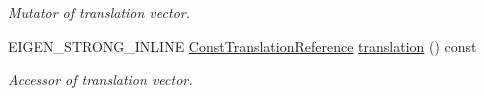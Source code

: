 \begin{DoxyCompactItemize}
\begin{DoxyCompactList}\small\item\em Mutator of translation vector. \end{DoxyCompactList}\item 
E\+I\+G\+E\+N\+\_\+\+S\+T\+R\+O\+N\+G\+\_\+\+I\+N\+L\+I\+NE \hyperlink{class_sophus_1_1_sim3_group_base_aee08d851899efe59011fb1b58dbf1139}{Const\+Translation\+Reference} \hyperlink{class_sophus_1_1_sim3_group_base_a5a6f1907abc5a581e4fca69dbb09687c}{translation} () const \hypertarget{class_sophus_1_1_sim3_group_base_a5a6f1907abc5a581e4fca69dbb09687c}{}\label{class_sophus_1_1_sim3_group_base_a5a6f1907abc5a581e4fca69dbb09687c}

\begin{DoxyCompactList}\small\item\em Accessor of translation vector. \end{DoxyCompactList}\end{DoxyCompactItemize}
